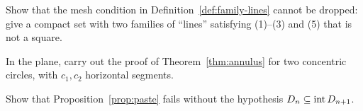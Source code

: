 \begin{exercise}
Show that the mesh condition in Definition~\ref{def:family-lines} cannot be dropped: give a compact set with two families of ``lines'' satisfying
(1)--(3) and (5) that is not a square.
\end{exercise}

\begin{exercise}
In the plane, carry out the proof of Theorem~\ref{thm:annulus} for two concentric circles, with $c_1,c_2$ horizontal segments.
\end{exercise}

\begin{exercise}
Show that Proposition~\ref{prop:paste} fails without the hypothesis $D_n\subseteq\operatorname{int} D_{n+1}$.
\end{exercise}
